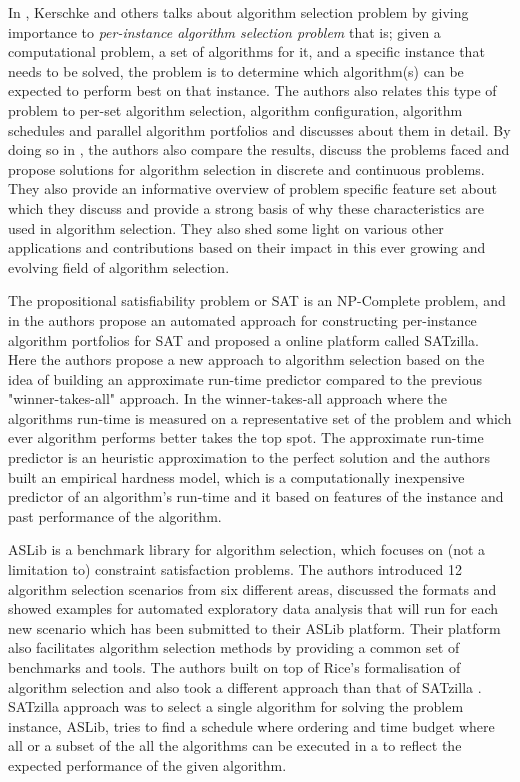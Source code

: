 In \citep{kerschke2018automated}, Kerschke and others talks about algorithm selection problem by giving importance to \textit{per-instance algorithm selection problem} that is; given a computational problem, a set of algorithms for it, and a specific instance that needs to be solved, the problem is to determine which algorithm(s) can be expected to perform best on that instance. The authors also relates this type of problem to per-set algorithm selection, algorithm configuration, algorithm schedules and parallel algorithm portfolios and discusses about them in detail. By doing so in \citep{kerschke2018automated}, the authors also compare the results, discuss the problems faced and propose solutions for algorithm selection in discrete and continuous problems. They also provide an informative overview of problem specific feature set about which they discuss and provide a strong basis of why these characteristics are used in algorithm selection. They also shed some light on various other applications and contributions based on their impact in this ever growing and evolving field of algorithm selection.

The propositional satisfiability problem or SAT is an NP-Complete problem, and in \citep{xu-et-al} the authors propose an automated approach for constructing per-instance algorithm portfolios for SAT and proposed a online platform called SATzilla. Here the authors propose a new approach to algorithm selection based on the idea of building an approximate run-time predictor compared to the previous "winner-takes-all" approach. In the winner-takes-all approach where the algorithms run-time is measured on a representative set of the problem and which ever algorithm performs better takes the top spot. The approximate run-time predictor is an heuristic approximation to the perfect solution and the authors built an empirical hardness model, which is a computationally inexpensive predictor of an algorithm’s run-time and it based on features of the instance and past performance of the algorithm.

ASLib \citep{bischl-et-al} is a benchmark library for algorithm selection, which focuses on (not a limitation to) constraint satisfaction problems. The authors introduced 12 algorithm selection scenarios from six diﬀerent areas, discussed the formats and showed examples for automated exploratory data analysis that will run for each new scenario which has been submitted to their ASLib platform. Their platform also facilitates algorithm selection methods by providing a common set of benchmarks and tools. The authors built on top of Rice's \citep{rice197665} formalisation of algorithm selection and also took a different approach than that of SATzilla \citep{xu-et-al}. SATzilla approach was to select a single algorithm for solving the problem instance, ASLib, tries to find a schedule where ordering and time budget where all or a subset of the all the algorithms can be executed in a to reflect the expected performance of the given algorithm.

